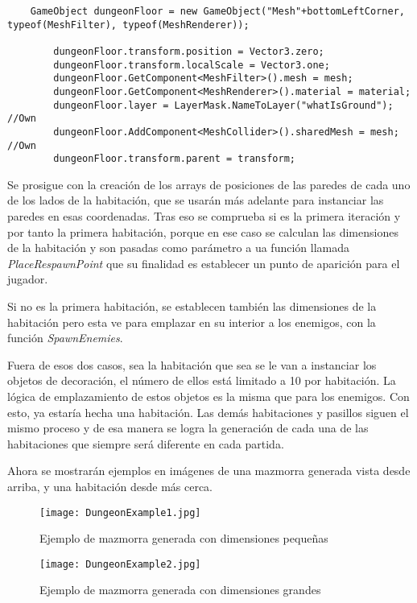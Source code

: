 \begin{lstlisting}
    GameObject dungeonFloor = new GameObject("Mesh"+bottomLeftCorner, typeof(MeshFilter), typeof(MeshRenderer));

        dungeonFloor.transform.position = Vector3.zero;
        dungeonFloor.transform.localScale = Vector3.one;
        dungeonFloor.GetComponent<MeshFilter>().mesh = mesh;
        dungeonFloor.GetComponent<MeshRenderer>().material = material;
        dungeonFloor.layer = LayerMask.NameToLayer("whatIsGround"); //Own
        dungeonFloor.AddComponent<MeshCollider>().sharedMesh = mesh; //Own
        dungeonFloor.transform.parent = transform;
\end{lstlisting}

Se prosigue con la creación de los arrays de posiciones de las paredes de cada uno de los lados de la habitación, que se usarán más adelante para instanciar las paredes en esas coordenadas. Tras eso se comprueba si es la primera iteración y por tanto la primera habitación, porque en ese caso se calculan las dimensiones de la habitación y son pasadas como parámetro a ua función llamada \textit{PlaceRespawnPoint} que su finalidad es establecer un punto de aparición para el jugador. 

Si no es la primera habitación, se establecen también las dimensiones de la habitación pero esta ve para emplazar en su interior a los enemigos, con la función \textit{SpawnEnemies}. 

Fuera de esos dos casos, sea la habitación que sea se le van a instanciar los objetos de decoración, el número de ellos está limitado a 10 por habitación. La lógica de emplazamiento de estos objetos es la misma que para los enemigos. Con esto, ya estaría hecha una habitación. Las demás habitaciones y pasillos siguen el mismo proceso y de esa manera se logra la generación de cada una de las habitaciones que siempre será diferente en cada partida.

Ahora se mostrarán ejemplos en imágenes de una mazmorra generada vista desde arriba, y una habitación desde más cerca.

\begin{figure}[H]
    \centering
    \texttt{[image: DungeonExample1.jpg]}
    \caption{Ejemplo de mazmorra generada con dimensiones pequeñas}
\end{figure}

\begin{figure}[H]
    \centering
    \texttt{[image: DungeonExample2.jpg]}
    \caption{Ejemplo de mazmorra generada con dimensiones grandes}
\end{figure}

